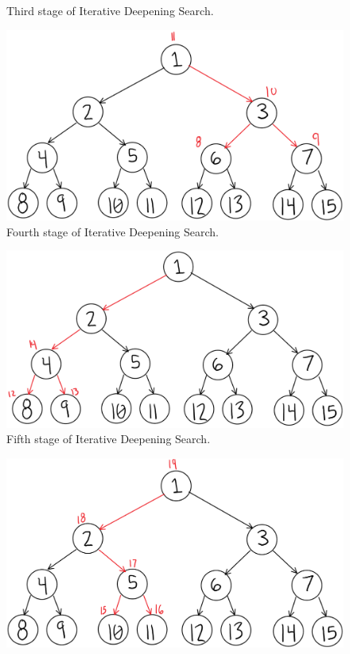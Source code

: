 \documentclass[11pt]{article}
\newenvironment{problem}[2][Problem]{\begin{trivlist}
\item[\hskip \labelsep {\bfseries #1}\hskip \labelsep {\bfseries #2.}]}{\end{trivlist}}
\begin{document}
\begin{problem}{10}
\begin{enumerate}
\begin{figure}
				\caption{Third stage of Iterative Deepening Search.}
				\label{fig.bfs}
			\end{figure}
			\begin{figure}
				\includegraphics[scale=0.5]{ID_4.PNG}
				\caption{Fourth stage of Iterative Deepening Search.}
				\label{fig.bfs}
			\end{figure}
			\begin{figure}
				\includegraphics[scale=0.5]{ID_5.PNG}
				\caption{Fifth stage of Iterative Deepening Search.}
				\label{fig.bfs}
			\end{figure}
			\begin{figure}
				\includegraphics[scale=0.5]{ID_6.PNG}

\end{figure}
\end{enumerate}
\end{problem}
\end{document}
